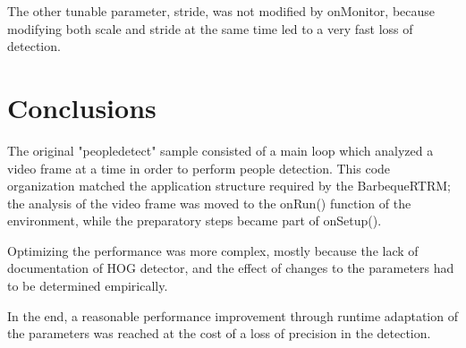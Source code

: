 The other tunable parameter, stride, was not modified by onMonitor, because
modifying both scale and stride at the same time led to a very fast loss of
detection.

\section{Conclusions}

The original "peopledetect" sample consisted of a main loop which analyzed a
video frame at a time in order to perform people detection.
This code organization
matched the application structure required by the BarbequeRTRM; the analysis of
the video frame was moved to the onRun() function of the environment, while the
preparatory steps became part of onSetup().

Optimizing the performance was more complex, mostly because the lack of documentation
of HOG detector,
and the effect of changes to the parameters had to be determined empirically.

In the end, a reasonable performance improvement through runtime adaptation of
the parameters was reached at the cost of a loss of precision in the detection.


